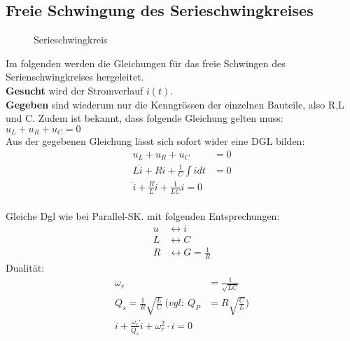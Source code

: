\subsection{Freie Schwingung des Serieschwingkreises}
\begin{wrapfigure}{l}{0.55\textwidth}
	\centering
	
	\vspace{-0.2cm}
	\caption{Serieschwingkreis}
	\label{fig:SerieSKGeschlossen}
\end{wrapfigure}

Im folgenden werden die Gleichungen für das freie Schwingen des
Serienschwingkreises hergeleitet.\\

\textbf{Gesucht} wird der Stromverlauf
$i(t)$. \\
\textbf{Gegeben} sind wiederum nur die Kenngrössen der einzelnen Bauteile, also
R,L und C. Zudem ist bekannt, dass folgende Gleichung gelten muss: \\ $u_L +
u_R + u_C = 0$ \\


Aus der gegebenen Gleichung lässt sich sofort wider eine DGL bilden: \\
\begin{align}
	u_L + u_R + u_C &= 0\nonumber\\
	L\dot{i} + Ri + \frac{1}{C}\int{i}dt&=0\nonumber\\
	\boxed{\ddot{i}+\frac{R}{L}\dot{i}+\frac{1}{LC}i=0}
\end{align}\\
Gleiche Dgl wie bei Parallel-SK. mit folgenden Entsprechungen:\\
\begin{align}
u &\leftrightarrow i\nonumber\\
L &\leftrightarrow C\nonumber\\
R &\leftrightarrow G=\frac{1}{R}\nonumber
\end{align}
Dualität:\\
\begin{align}
\omega_r&=\frac{1}{\sqrt{LC}}\nonumber\\
Q_s=\frac{1}{R}\sqrt{\frac{L}{C}}\ (vgl:\ Q_P&=R\sqrt{\frac{C}{L}})\nonumber\\
\boxed{\ddot i + \frac{\omega_r}{Q_s}\dot i + \omega_r^2\cdot i = 0}
\end{align}\\

